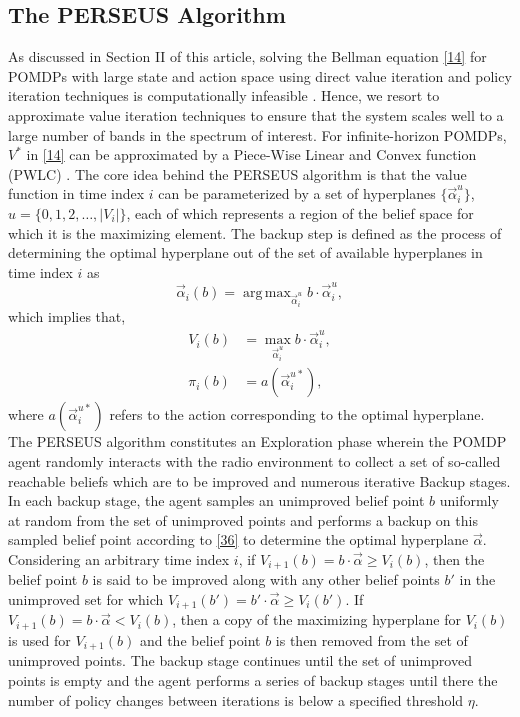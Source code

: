 \documentclass[10pt,twocolumn]{IEEEtran}
\newcommand{\bk}[1]{{\color{red}{[BK: #1]}}}
\DeclareMathOperator*{\argmax}{arg\,max}
\begin{document}
\subsection{The PERSEUS Algorithm}
As discussed in Section II of this article, solving the Bellman equation \eqref{14} for POMDPs with large state and action space using direct value iteration and policy iteration techniques is computationally infeasible \bk{citation}. Hence, we resort to approximate value iteration techniques \bk{citation} to ensure that the system scales well to a large number of bands in the spectrum of interest. For infinite-horizon POMDPs, $V^*$ in \eqref{14} can be approximated by a Piece-Wise Linear and Convex function (PWLC) \bk{citation}. The core idea behind the PERSEUS algorithm is that the value function in time index $i$ can be parameterized by a set of hyperplanes $\{\vec{\alpha}_i^{u}\}$, $u = \{0,1,2,\dots,|V_i|\}$, each of which represents a region of the belief space for which it is the maximizing element. The backup step is defined as the process of determining the optimal hyperplane out of the set of available hyperplanes in time index $i$ as
\begin{equation}\label{36}
    \vec{\alpha}_{i}(b) = \argmax_{\vec{\alpha}_{i}^u} b \cdot \vec{\alpha}_{i}^u,
\end{equation}
which implies that,
\begin{equation}\label{37}
    \begin{split}
        V_i(b) &= \max_{\vec{\alpha}_{i}^u} b \cdot \vec{\alpha}_{i}^u,\\
        \pi_i(b) &= a(\vec{\alpha}_i^{u*}),
    \end{split}
\end{equation}
where $a(\vec{\alpha}_i^{u*})$ refers to the action corresponding to the optimal hyperplane. The PERSEUS algorithm constitutes an Exploration phase wherein the POMDP agent randomly interacts with the radio environment to collect a set of so-called reachable beliefs which are to be improved and numerous iterative Backup stages. In each backup stage, the agent samples an unimproved belief point $b$ uniformly at random from the set of unimproved points and performs a backup on this sampled belief point according to \eqref{36} to determine the optimal hyperplane $\vec{\alpha}$. Considering an arbitrary time index $i$, if $V_{i+1}(b) = b \cdot \vec{\alpha} \geq V_{i}(b)$, then the belief point $b$ is said to be improved along with any other belief points $b'$ in the unimproved set for which $V_{i+1}(b') = b' \cdot \vec{\alpha} \geq V_{i}(b')$. If $V_{i+1}(b) = b \cdot \vec{\alpha} < V_{i}(b)$, then a copy of the maximizing hyperplane for $V_i(b)$ is used for $V_{i+1}(b)$ and the belief point $b$ is then removed from the set of unimproved points. The backup stage continues until the set of unimproved points is empty and the agent performs a series of backup stages until there the number of policy changes between iterations is below a specified threshold $\eta$. \bk{Add the algorithm block}

 
\end{document}

